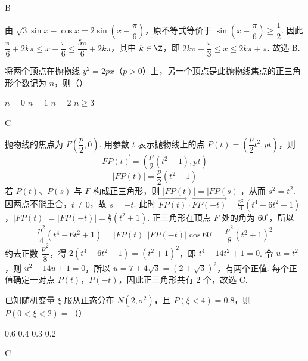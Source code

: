 \begin{answer}
B
\end{answer}

\begin{solution}
由 \(\sqrt{3}\sin x-\cos x=2\sin\left(x-\dfrac{\pi}{6}\right)\)，原不等式等价于 \(\sin\left(x-\dfrac{\pi}{6}\right)\geqslant\dfrac{1}{2}\). 因此 \(\dfrac{\pi}{6}+2k\pi\leqslant x-\dfrac{\pi}{6}\leqslant\dfrac{5\pi}{6}+2k\pi\)，其中 \(k\in\Z\)，即 \(2k\pi+\dfrac{\pi}{3}\leqslant x\leqslant2k\pi+\pi\). 故选 B.
\end{solution}

\begin{problem}
将两个顶点在抛物线 \(y^2=2px\)（\(p>0\)）上，另一个顶点是此抛物线焦点的正三角形个数记为 \(n\)，则（\quad）

\choices
    {\(n=0\)}
    {\(n=1\)}
    {\(n=2\)}
    {\(n\geqslant3\)}
\end{problem}

\begin{answer}
C
\end{answer}

\begin{solution}
抛物线的焦点为 \(F\left(\dfrac{p}{2},0\right)\). 用参数 \(t\) 表示抛物线上的点 \(P(t)=\left(\dfrac{p}{2}t^2,pt\right)\)，则
\[
\overrightarrow{FP(t)}=\left(\dfrac{p}{2}(t^2-1),pt\right)
\]
\[
|FP(t)|=\dfrac{p}{2}(t^2+1)
\]
若 \(P(t)\)、\(P(s)\) 与 \(F\) 构成正三角形，则 \(|FP(t)|=|FP(s)|\)，从而 \(s^2=t^2\). 因两点不能重合，\(t\ne0\)，故 \(s=-t\). 此时
\(\overrightarrow{FP(t)}\cdot\overrightarrow{FP(-t)}=\frac{p^2}{4}\left(t^4-6t^2+1\right)\)，\(|FP(t)|=|FP(-t)|=\frac{p}{2}(t^2+1)\).
正三角形在顶点 \(F\) 处的角为 \(60^\circ\)，所以
\[
\frac{p^2}{4}\left(t^4-6t^2+1\right)=|FP(t)|\,|FP(-t)|\cos60^\circ=\frac{p^2}{8}(t^2+1)^2
\]
约去正数 \(\dfrac{p^2}{8}\)，得 \(2\left(t^4-6t^2+1\right)=(t^2+1)^2\)，即 \(t^4-14t^2+1=0\). 令 \(u=t^2\)，则 \(u^2-14u+1=0\)，所以 \(u=7\pm4\sqrt{3}=(2\pm\sqrt{3})^2\)，有两个正值. 每个正值确定一对点 \(P(t)\)，\(P(-t)\)，因此正三角形共有 \(2\) 个，故选 C.
\end{solution}

\begin{problem}
已知随机变量 \(\xi\) 服从正态分布 \(N(2,\sigma^2)\)，且 \(P(\xi<4)=0.8\)，则 \(P(0<\xi<2)=\)（\quad）

\choices
    {\(0.6\)}
    {\(0.4\)}
    {\(0.3\)}
    {\(0.2\)}
\end{problem}

\begin{answer}
C
\end{answer}

